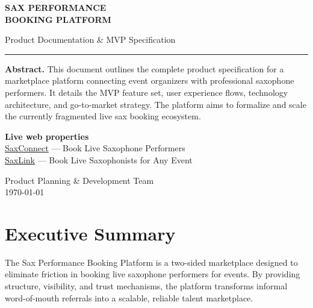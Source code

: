\documentclass[11pt,a4paper]{article}
\begin{document}
\begin{titlepage}
  \centering
  \vspace*{3cm}
  {\fontsize{36}{44}\selectfont\bfseries\color{indigo} SAX PERFORMANCE\\[0.3em]
  \color{indigomid} BOOKING PLATFORM\par}
  \vspace{1em}
  {\large\color{mygray} Product Documentation \& MVP Specification\par}
  \vspace{2em}
  \textcolor{indigomid}{\rule{0.4\textwidth}{1.5pt}}
  \vspace{2em}

  \begin{tcolorbox}[colback=indigolight, colframe=indigomid, boxrule=0.5pt,
    width=0.8\textwidth, left=12pt, right=12pt, top=10pt, bottom=10pt]
    \textbf{Abstract.} This document outlines the complete product specification
    for a marketplace platform connecting event organizers with professional
    saxophone performers. It details the MVP feature set, user experience flows,
    technology architecture, and go-to-market strategy. The platform aims to
    formalize and scale the currently fragmented live sax booking ecosystem.
  \end{tcolorbox}

  \vspace{1.5em}
  {\small\color{mygray}\textbf{Live web properties}\\[0.5em]
  \href{https://saxconnect.netlify.app/}{SaxConnect} --- Book Live Saxophone Performers\\
  \href{https://saxlink.netlify.app/}{SaxLink} --- Book Live Saxophonists for Any Event\par}

  \vfill
  {\normalsize\color{mygray} Product Planning \& Development Team\\[0.5em]
  \today}
\end{titlepage}

\tableofcontents
\newpage

\section{Executive Summary}

The Sax Performance Booking Platform is a two-sided marketplace designed to
eliminate friction in booking live saxophone performers for events. By providing
structure, visibility, and trust mechanisms, the platform transforms informal
word-of-mouth referrals into a scalable, reliable talent marketplace.
\end{document}
